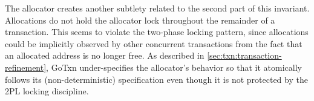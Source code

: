 The allocator creates another subtlety related to the second part of this
invariant. Allocations do not hold the allocator lock throughout the remainder
of a transaction. This seems to violate the two-phase locking pattern, since
allocations could be implicitly observed by other concurrent transactions from
the fact that an allocated address is no longer free. As described in
\cref{sec:txn:transaction-refinement}, GoTxn under-specifies the allocator's behavior so that it
atomically follows its (non-deterministic) specification even though it is not
protected by the 2PL locking discipline.


